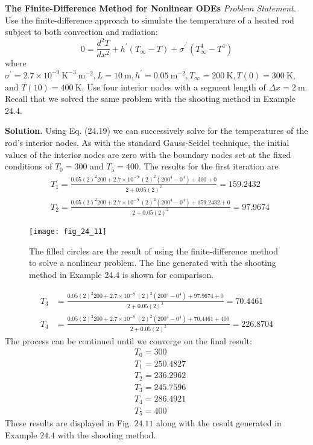 \documentclass[../main.tex]{subfiles}
\begin{document}
\begin{exmp}
    \textbf{The Finite-Difference Method for Nonlinear ODEs}
    \noindent\textit{Problem Statement.} Use the finite-difference approach to simulate the temperature of a heated rod subject to both convection and radiation:
    $$
    0=\frac{d^{2} T}{d x^{2}}+h^{\prime}\left(T_{\infty}-T\right)+\sigma^{\prime^{\prime}}\left(T_{\infty}^{4}-T^{4}\right)
    $$
    where $\sigma^{\prime}=2.7 \times 10^{-9} \mathrm{~K}^{-3} \mathrm{~m}^{-2}, L=10 \mathrm{~m}, h^{\prime}=0.05 \mathrm{~m}^{-2}, T_{\infty}=200 \mathrm{~K}, T(0)=300 \mathrm{~K}$, and $T(10)=400 \mathrm{~K}$. Use four interior nodes with a segment length of $\Delta x=2 \mathrm{~m}$. Recall that we solved the same problem with the shooting method in Example 24.4.
    
    \noindent\textbf{Solution.} Using Eq. (24.19) we can successively solve for the temperatures of the rod's interior nodes. As with the standard Gauss-Seidel technique, the initial values of the interior nodes are zero with the boundary nodes set at the fixed conditions of $T_{0}=300$ and $T_{5}=400$. The results for the first iteration are
    $$
    \begin{aligned}
    &T_{1}=\frac{0.05(2)^{2} 200+2.7 \times 10^{-9^{\prime}}(2)^{2}\left(200^{4}-0^{4}\right)+300+0}{2+0.05(2)^{2}}=159.2432 \\
    &T_{2}=\frac{0.05(2)^{2} 200+2.7 \times 10^{-9^{\prime}}(2)^{2}\left(200^{4}-0^{4}\right)+159.2432+0}{2+0.05(2)^{2}}=97.9674
    \end{aligned}
    $$

    \begin{figure}[H]
        \centering
        \texttt{[image: fig\_24\_11]}
       \caption{\textsf{The filled circles are the result of using the finite-difference method to solve a nonlinear problem. The line generated with the shooting method in Example 24.4 is shown for comparison.}}\label{fig:fig_24_11}
    \end{figure}

    $$
    \begin{aligned}
    T_{3} &=\frac{0.05(2)^{2} 200+2.7 \times 10^{-9^{\prime}}(2)^{2}\left(200^{4}-0^{4}\right)+97.9674+0}{2+0.05(2)^{2}}=70.4461 \\
    T_{4} &=\frac{0.05(2)^{2} 200+2.7 \times 10^{-9^{\prime}}(2)^{2}\left(200^{4}-0^{4}\right)+70.4461+400}{2+0.05(2)^{2}}=226.8704
    \end{aligned}
    $$
    The process can be continued until we converge on the final result:
    $$
    \begin{aligned}
    &T_{0}=300 \\
    &T_{1}=250.4827 \\
    &T_{2}=236.2962 \\
    &T_{3}=245.7596 \\
    &T_{4}=286.4921 \\
    &T_{5}=400
    \end{aligned}
    $$
    These results are displayed in Fig. $24.11$ along with the result generated in Example $24.4$ with the shooting method.
\end{exmp}\vspace*{2cm}
\end{document}
